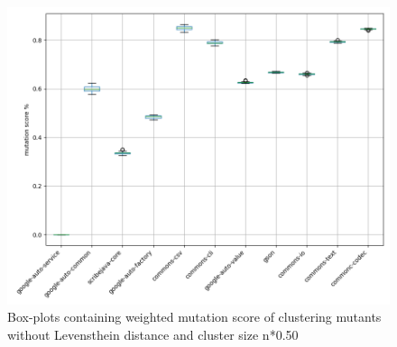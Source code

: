 \documentclass[../../main]{subfiles}
\begin{document}
\begin{figure}[H]
\includegraphics[width=\textwidth]{images/boxplot_summary/boxplot_hc_no_distance_0.5.png}
\caption{\label{box:clustering_no_distance_50}Box-plots containing weighted mutation score of clustering mutants without Levensthein distance and cluster size n*0.50}
\end{figure}
\end{document}
